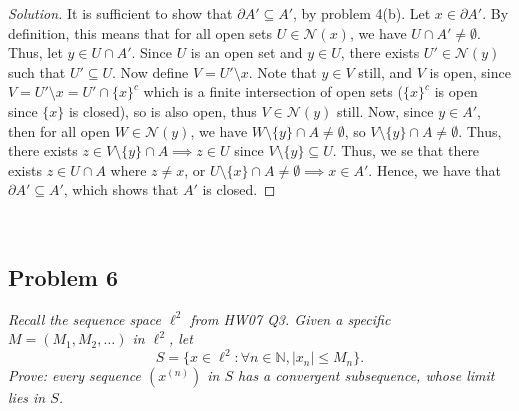 \documentclass{article}
\newcommand{\N}{{\mathbb N}}
\begin{document}
\begin{proof}[Solution]\let\qed\relax
	It is sufficient to show that $\partial A' \subseteq A'$,
	by problem 4(b).
	Let $x \in \partial A'$.
	By definition, this means that for all open sets $U \in \mathcal{N}(x)$,
	we have $U \cap A' \neq \emptyset$.
	Thus, let $y \in U \cap A'$.
	Since $U$ is an open set and $y \in U$,
	there exists $U' \in \mathcal{N}(y)$ such that $U' \subseteq U$.
	Now define $V = U'\setminus{x}$.
	Note that $y \in V$ still,
	and $V$ is open, since $V = U' \setminus{x} = U' \cap \{x\}^c$
	which is a finite intersection of open sets
	($\{x\}^c$ is open since $\{x\}$ is closed), so is also open,
	thus $V \in \mathcal{N}(y)$ still.
	Now, since $y \in A'$, then for all open $W \in \mathcal{N}(y)$,
	we have $W\setminus\{y\} \cap A\neq \emptyset$,
	so $V\setminus\{y\} \cap A \neq \emptyset$.
	Thus, there exists $z \in V \setminus\{y\} \cap A \implies
	z \in U$ since $V\setminus\{y\} \subseteq U$.
	Thus, we se that there exists $z \in U \cap A$
	where $z \neq x$, or $U \setminus \{x\} \cap A \neq \emptyset \implies x \in A'$.
	Hence, we have that $\partial A' \subseteq A'$,
	which shows that $A'$ is closed.
\end{proof}
\clearpage
~\clearpage

\subsection*{Problem 6}
{\it Recall the sequence space $\ell^2$ from HW07 Q3.
Given a specific $M = (M_1,M_2,\dots)$ in $\ell^2$, let
\[
	S = \{x \in \ell^2 \colon \forall n \in \N, |x_n| \leq M_n\}.
\]
Prove: every sequence $\left(x^{(n)}\right)$ in $S$ has a convergent subsequence,
whose limit lies in $S$.}
\end{document}
